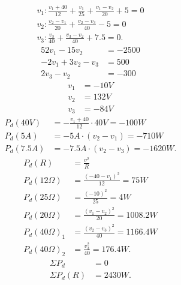 \documentclass{zc-ust-hw}
\begin{document}
\begin{enumerate}
    \begin{gather}
      v_1 : \frac{v_1 + 40}{12} + \frac{v_1}{25} + \frac{v_1-v_2}{20} + 5 = 0 \\
      v_2 : \frac{v_2-v_1}{20} + \frac{v_2-v_3}{40} - 5 = 0 \\
      v_3 : \frac{v_3}{40} + \frac{v_3-v_2}{40} + 7.5 = 0
    .\end{gather}
    \begin{align}
          52v_1-15v_2    &= -2500 \\
          -2v_1+3v_2-v_3 &= 500 \\
          2v_3-v_2       &= -300
    \end{align}
    \begin{align}
      v_1 &= -10 V \\
      v_2 &= 132 V \\
      v_3 &= -84 V
    \end{align}
    \begin{align}
      P_d(40V)  &= -\frac{v_1+40}{12} \cdot 40V = -100W  \\
      P_d(5A)   &= -5A \cdot (v_2-v_1) = -710W \\
      P_d(7.5A) &= -7.5A \cdot (v_2-v_3) = -1620W
    .\end{align}
    \begin{align}
      P_d(R) &= \frac{v^2}{R} \\
      P_d(12\Omega) &= \frac{(-40-v_1)^2}{12} = 75 W \\
      P_d(25\Omega) &= \frac{(-10)^2}{25} = 4 W \\
      P_d(20\Omega) &= \frac{(v_1-v_2)^2}{20} = 1008.2 W \\
      P_d(40\Omega)_1 &= \frac{(v_2-v_3)^2}{40} = 1166.4 W \\
      P_d(40\Omega)_2 &= \frac{v_3^2}{40} = 176.4 W
    .\end{align}
    \begin{align}
      \Sigma P_d &= 0 \\
      \Sigma P_d(R) &= 2430 W
    .\end{align}


\end{enumerate}
\end{document}
